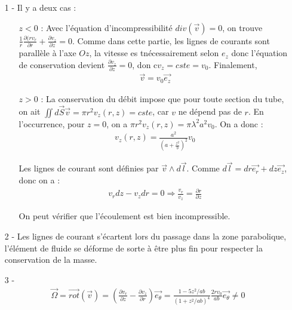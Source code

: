 \documentclass{report}
\begin{document}
\begin{itemize}
	\item[1 - ] Il y a deux cas : 
	 
	\begin{itemize}
		\item[$z<0$ : ] Avec l'équation d'incompressibilité $div(\vec{v})=0$, on trouve $\frac{1}{r}\frac{\partial(r v_r}{\partial r}+\frac{\partial v_z}{\partial z} =0$. Comme dans cette partie, les lignes de courants sont parallèle à l'axe $Oz$, la vitesse es tnécessairement selon $e_z$ donc l'équation de conservation devient $\frac{\partial v_z}{\partial z} =0$, don c$v_z=cste=v_0$. Finalement,
		\begin{align*}
			\vec{v}=v_0\vec{e_z}
		\end{align*}
		
		\item[$z>0$ : ] 	La conservation du débit impose que pour toute section du tube, on ait $\iint d\vec{S}\vec{v}= \pi r^2v_z(r,z)=cste$, car $v$ ne dépend pas de $r$. En l'occurrence, pour $z=0$, on a $\pi r^2v_z(r,z)=\pi \lambda^2a^2v_0$. On a donc : 
\begin{align*}
	v_z(r,z)=\frac{a^2}{\left(a+\frac{z^2}{b} \right)^2 }v_0
\end{align*}	

Les lignes de courant sont définies par $\vec{v}\wedge d\vec{l}$. Comme $d\vec{l}=dr\vec{e_r}+dz\vec{e_z}$, donc on a :
\begin{align*}
	v_rdz-v_zdr=0\Longrightarrow \frac{v_r}{v_z}=\frac{\partial r}{\partial z}
\end{align*}

\noindent{}
	
	On peut vérifier que l'écoulement est bien incompressible. 
	\end{itemize}

\item[2 - ] Les lignes de courant s'écartent lors du passage dans la zone parabolique, l'élément de fluide se déforme de sorte à être plus fin pour respecter la conservation de la masse. 

\item[3 - ] \begin{align*}
\vec{\Omega}=\vec{rot}(\vec{v})=\left(\frac{\partial v_r}{\partial z}-\frac{\partial v_z}{\partial r} \right)\vec{e_\theta}=\frac{1-5z^2/ab}{\left( 1+z^2/ab\right)^4}\frac{2rv_0}{ab}\vec{e_\theta}\neq 0
\end{align*}

\end{itemize}
\end{document}
